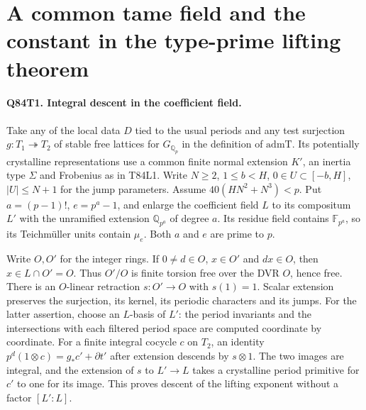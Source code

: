 \section{A common tame field and the constant in the type-prime lifting theorem}

\paragraph{Q84T1. Integral descent in the coefficient field.}
Take any of the local data $D$ tied to the usual periods and any test
surjection $g:T_1\twoheadrightarrow T_2$ of stable free lattices for
$G_{\mathbb Q_p}$ in the definition of $\mathrm{admT}$. Its potentially
crystalline representations use a common finite normal extension $K'$,
an inertia type $\Sigma$ and Frobenius as in T84L1. Write
$N\ge2$, $1\le b<H$, $0\in U\subset[-b,H]$, $|U|\le N+1$ for
the jump parameters. Assume $40(HN^2+N^3)<p$. Put $a=(p-1)!$,
$e=p^a-1$, and enlarge the coefficient field $L$ to its compositum
$L'$ with the unramified extension $\mathbb Q_{p^a}$ of degree $a$.
Its residue field contains $\mathbb F_{p^a}$, so its Teichm\"uller units
contain $\mu_e$. Both $a$ and $e$ are prime to $p$.

Write $O,O'$ for the integer rings. If $0\ne d\in O$, $x\in O'$
and $dx\in O$, then $x\in L\cap O'=O$. Thus $O'/O$ is finite
torsion free over the DVR $O$, hence free. There is an $O$-linear
retraction $s:O'\to O$ with $s(1)=1$. Scalar extension preserves
the surjection, its kernel, its periodic characters and its jumps.
For the latter assertion, choose an $L$-basis of $L'$: the period
invariants and the intersections with each filtered period space
are computed coordinate by coordinate. For a finite integral
cocycle $c$ on $T_2$, an identity
$p^d(1\otimes c)=g_*c'+\partial t'$ after extension descends
by $s\otimes1$. The two images are integral, and the extension
of $s$ to $L'\to L$ takes a crystalline period primitive for
$c'$ to one for its image. This proves descent of the lifting
exponent without a factor $[L':L]$.

